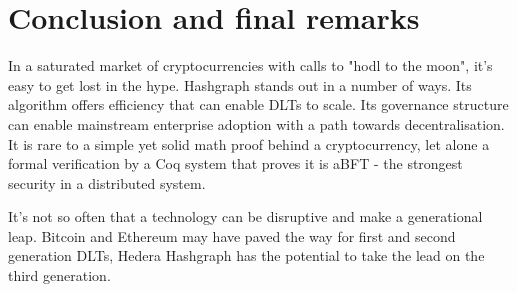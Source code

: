 \section{Conclusion and final remarks}

In a saturated market of cryptocurrencies with calls to "hodl to the moon", it's easy to get lost in the hype. Hashgraph stands out in a number of ways. Its algorithm offers efficiency that can enable DLTs to scale. Its governance structure can enable mainstream enterprise adoption with a path towards decentralisation. It is rare to a simple yet solid math proof behind a cryptocurrency, let alone a formal verification by a Coq system that proves it is aBFT - the strongest security in a distributed system.

It's not so often that a technology can be disruptive and make a generational leap. Bitcoin and Ethereum may have paved the way for first and second generation DLTs, Hedera Hashgraph has the potential to take the lead on the third generation.
